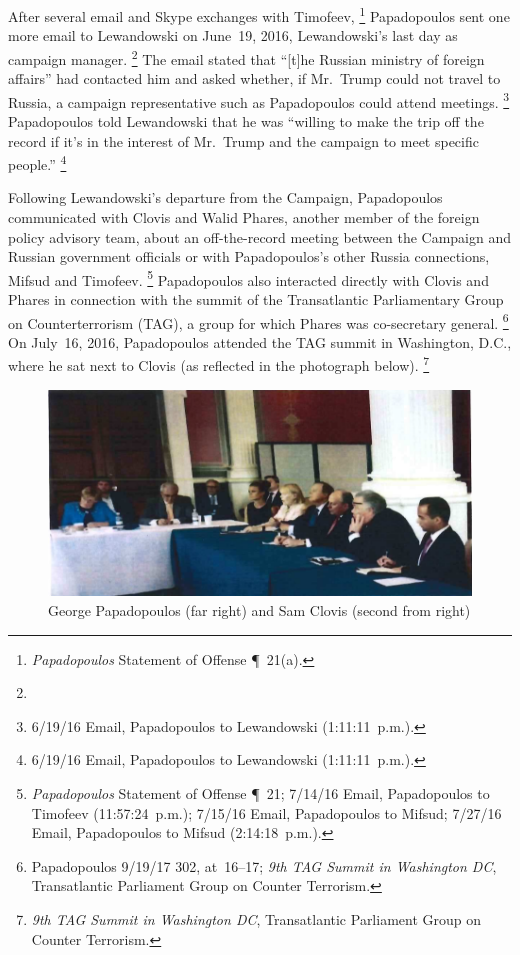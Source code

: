 After several email and Skype exchanges with Timofeev,%
\footnote{\textit{Papadopoulos} Statement of Offense \P~21(a).}
Papadopoulos sent one more email to Lewandowski on June~19, 2016, Lewandowski's last day as campaign manager.%
\footnote{}
The email stated that ``[t]he Russian ministry of foreign affairs'' had contacted him and asked whether, if Mr.~Trump could not travel to Russia, a campaign representative such as Papadopoulos could attend meetings.%
\footnote{6/19/16 Email, Papadopoulos to Lewandowski (1:11:11~p.m.).}
Papadopoulos told Lewandowski that he was ``willing to make the trip off the record if it's in the interest of Mr.~Trump and the campaign to meet specific people.''%
\footnote{6/19/16 Email, Papadopoulos to Lewandowski (1:11:11~p.m.).}

Following Lewandowski's departure from the Campaign, Papadopoulos communicated with Clovis and Walid Phares, another member of the foreign policy advisory team, about an off-the-record meeting between the Campaign and Russian government officials or with Papadopoulos's other Russia connections, Mifsud and Timofeev.%
\footnote{\textit{Papadopoulos} Statement of Offense \P~21;
7/14/16 Email, Papadopoulos to Timofeev (11:57:24~p.m.);
7/15/16 Email, Papadopoulos to Mifsud;
7/27/16 Email, Papadopoulos to Mifsud (2:14:18~p.m.).}
Papadopoulos also interacted directly with Clovis and Phares in connection with the summit of the Transatlantic Parliamentary Group on Counterterrorism (TAG), a group for which Phares was co-secretary general.%
\footnote{Papadopoulos 9/19/17 302, at~16--17;
\textit{9th TAG Summit in Washington DC}, Transatlantic Parliament Group on Counter Terrorism.}
On July~16, 2016, Papadopoulos attended the TAG summit in Washington, D.C., where he sat next to Clovis (as reflected in the photograph below).%
\footnote{\textit{9th TAG Summit in Washington DC}, Transatlantic Parliament Group on Counter Terrorism.}

\begin{figure}[t]
    \vspace{-20pt}
    \begin{center}
        \includegraphics[width=5in]{images/p-91-papadopolous-clovis.png}%
    \end{center}
    \vspace{-20pt}
    \caption*{George Papadopoulos (far right) and Sam Clovis (second from right)}
    \vspace{-10pt}
    \label{fig:papadopolous-clovis}
\end{figure}

